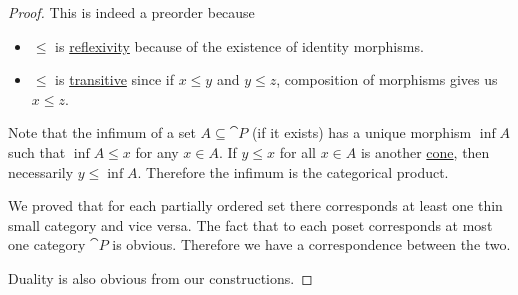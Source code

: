 \begin{proof}
  This is indeed a preorder because
  \begin{itemize}
    \item \( \leq \) is \hyperref[def:binary_relation/reflexive]{reflexivity} because of the existence of identity morphisms.
    \item \( \leq \) is \hyperref[def:binary_relation/transitive]{transitive} since if \( x \leq y \) and \( y \leq z \), composition of morphisms gives us \( x \leq z \).
  \end{itemize}

  Note that the infimum of a set \( A \subseteq \cat{P} \) (if it exists) has a unique morphism \( \inf A \) such that \( \inf A \leq x \) for any \( x \in A \). If \( y \leq x \) for all \( x \in A \) is another \hyperref[def:categorical_cone]{cone}, then necessarily \( y \leq \inf A \). Therefore the infimum is the categorical product.

  We proved that for each partially ordered set there corresponds at least one thin small category and vice versa. The fact that to each poset corresponds at most one category \( \cat{P} \) is obvious. Therefore we have a correspondence between the two.

  Duality is also obvious from our constructions.
\end{proof}
